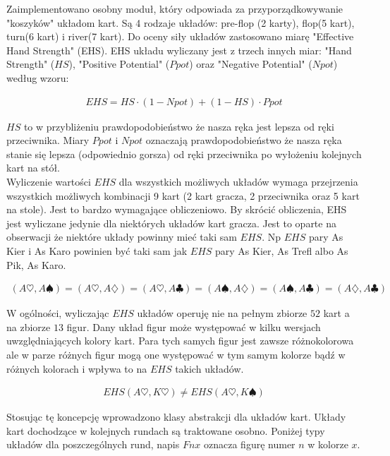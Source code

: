 \documentclass[licencjacka]{pracamgr}
\begin{document}
Zaimplementowano osobny moduł, który odpowiada za przyporządkowywanie "koszyków" układom kart.
Są 4 rodzaje układów: pre-flop (2 karty), flop(5 kart), turn(6 kart) i river(7 kart).
Do oceny siły układów zastosowano miarę "Effective Hand Strength" (EHS). EHS układu wyliczany
jest z trzech innych miar: "Hand Strength" ($HS$), "Positive Potential" ($Ppot$) oraz "Negative Potential" ($Npot$) według
wzoru:

\begin{align*}
EHS = HS \cdot (1 - Npot) + (1 - HS) \cdot Ppot
\end{align*}

\noindent
$HS$ to w przybliżeniu prawdopodobieństwo że nasza ręka jest lepsza od ręki przeciwnika. Miary $Ppot$ i $Npot$ oznaczają
prawdopodobieństwo że nasza ręka stanie się lepsza (odpowiednio gorsza) od ręki przeciwnika po wyłożeniu kolejnych kart na stół. \\

\noindent
Wyliczenie wartości $EHS$ dla wszystkich możliwych układów wymaga przejrzenia wszystkich możliwych kombinacji 9 kart (2 kart gracza, 2 przeciwnika
oraz 5 kart na stole). Jest to bardzo wymagające obliczeniowo. By skrócić obliczenia, EHS jest wyliczane jedynie dla niektórych układów
kart gracza. Jest to oparte na obserwacji że niektóre układy powinny mieć taki sam $EHS$. Np $EHS$ pary As Kier i As Karo powinien być taki
sam jak $EHS$ pary As Kier, As Trefl albo As Pik, As Karo. 

\begin{align*}
(A\heartsuit, A\spadesuit) = (A\heartsuit, A\diamondsuit) = (A\heartsuit, A\clubsuit) = (A\spadesuit, A\diamondsuit) =
(A\spadesuit, A\clubsuit) = (A\diamondsuit, A\clubsuit)
\end{align*}

\noindent
W ogólności, wyliczając $EHS$ układów operuję nie na pełnym zbiorze $52$ kart a na zbiorze $13$ figur. Dany układ figur
może występować w kilku wersjach uwzględniających kolory kart. Para tych samych figur jest zawsze różnokolorowa ale w 
parze różnych figur mogą one występować w tym samym kolorze bądź w różnych kolorach i wpływa to na $EHS$ takich układów.

\begin{align*}
EHS(A\heartsuit, K\heartsuit) \neq EHS(A\heartsuit, K\spadesuit)
\end{align*}

\noindent
Stosując tę koncepcję wprowadzono klasy abstrakcji dla układów kart. Układy kart dochodzące w kolejnych rundach są traktowane
osobno. Poniżej typy układów dla poszczególnych rund, napis $Fnx$ oznacza figurę numer $n$ w kolorze $x$. 
\end{document}
